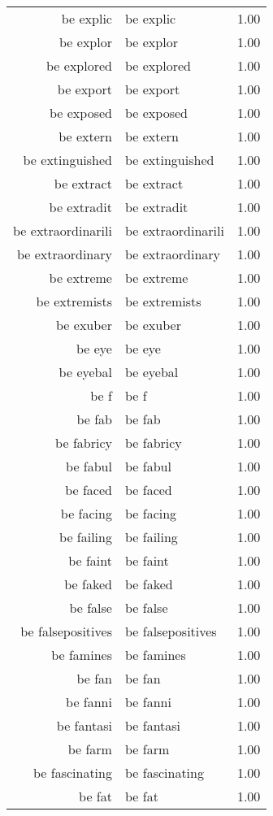 \begin{table}[ht]
\begin{tabular}{rlr}
  be explic & be explic & 1.00 \\ 
  be explor & be explor & 1.00 \\ 
  be explored & be explored & 1.00 \\ 
  be export & be export & 1.00 \\ 
  be exposed & be exposed & 1.00 \\ 
  be extern & be extern & 1.00 \\ 
  be extinguished & be extinguished & 1.00 \\ 
  be extract & be extract & 1.00 \\ 
  be extradit & be extradit & 1.00 \\ 
  be extraordinarili & be extraordinarili & 1.00 \\ 
  be extraordinary & be extraordinary & 1.00 \\ 
  be extreme & be extreme & 1.00 \\ 
  be extremists & be extremists & 1.00 \\ 
  be exuber & be exuber & 1.00 \\ 
  be eye & be eye & 1.00 \\ 
  be eyebal & be eyebal & 1.00 \\ 
  be f & be f & 1.00 \\ 
  be fab & be fab & 1.00 \\ 
  be fabricy & be fabricy & 1.00 \\ 
  be fabul & be fabul & 1.00 \\ 
  be faced & be faced & 1.00 \\ 
  be facing & be facing & 1.00 \\ 
  be failing & be failing & 1.00 \\ 
  be faint & be faint & 1.00 \\ 
  be faked & be faked & 1.00 \\ 
  be false & be false & 1.00 \\ 
  be falsepositives & be falsepositives & 1.00 \\ 
  be famines & be famines & 1.00 \\ 
  be fan & be fan & 1.00 \\ 
  be fanni & be fanni & 1.00 \\ 
  be fantasi & be fantasi & 1.00 \\ 
  be farm & be farm & 1.00 \\ 
  be fascinating & be fascinating & 1.00 \\ 
  be fat & be fat & 1.00 \\ 

\end{tabular}
\end{table}
